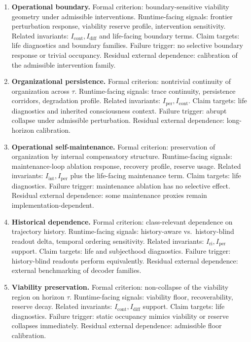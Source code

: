 \documentclass[11pt,a4paper]{article}
\theoremstyle{definition}
\newcommand{\Iper}{I_{\mathrm{per}}}
\newcommand{\Iri}{I_{\mathrm{ri}}}
\newcommand{\Iint}{I_{\mathrm{int}}}
\newcommand{\Icont}{I_{\mathrm{cont}}}
\newcommand{\Idiff}{I_{\mathrm{diff}}}
\begin{document}
\begin{enumerate}[leftmargin=*,itemsep=0.5em]
\item \textbf{Operational boundary.} Formal criterion: boundary-sensitive viability geometry under admissible interventions. Runtime-facing signals: frontier perturbation response, viability reserve profile, intervention sensitivity. Related invariants: $\Icont,\Idiff$ and life-facing boundary terms. Claim targets: life diagnostics and boundary families. Failure trigger: no selective boundary response or trivial occupancy. Residual external dependence: calibration of the admissible intervention family.

\item \textbf{Organizational persistence.} Formal criterion: nontrivial continuity of organization across $\tau$. Runtime-facing signals: trace continuity, persistence corridors, degradation profile. Related invariants: $\Iper,\Icont$. Claim targets: life diagnostics and inherited consciousness context. Failure trigger: abrupt collapse under admissible perturbation. Residual external dependence: long-horizon calibration.

\item \textbf{Operational self-maintenance.} Formal criterion: preservation of organization by internal compensatory structure. Runtime-facing signals: maintenance-loop ablation response, recovery profile, reserve usage. Related invariants: $\Iint,\Iper$ plus the life-facing maintenance term. Claim targets: life diagnostics. Failure trigger: maintenance ablation has no selective effect. Residual external dependence: some maintenance proxies remain implementation-dependent.

\item \textbf{Historical dependence.} Formal criterion: class-relevant dependence on trajectory history. Runtime-facing signals: history-aware vs.\ history-blind readout delta, temporal ordering sensitivity. Related invariants: $\Iri,\Iper$ support. Claim targets: life and subjecthood diagnostics. Failure trigger: history-blind readouts perform equivalently. Residual external dependence: external benchmarking of decoder families.

\item \textbf{Viability preservation.} Formal criterion: non-collapse of the viability region on horizon $\tau$. Runtime-facing signals: viability floor, recoverability, reserve decay. Related invariants: $\Icont,\Idiff$ support. Claim targets: life diagnostics. Failure trigger: static occupancy mimics viability or reserve collapses immediately. Residual external dependence: admissible floor calibration.


\end{enumerate}
\end{document}
